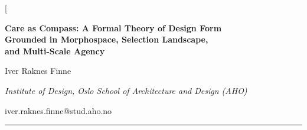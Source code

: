 



\twocolumn[{%
\begin{@twocolumnfalse}

\vspace*{2mm}

{\centering
{\Large\bfseries Care as Compass: A Formal Theory of Design Form\\[2pt]
Grounded in Morphospace, Selection Landscape,\\[2pt]
and Multi-Scale Agency\par}

\vspace{8pt}

{\normalsize Iver Raknes Finne\par}
\vspace{1pt}
{\small\itshape Institute of Design, Oslo School of Architecture and Design (AHO)\par}
\vspace{0pt}
{\small iver.raknes.finne@stud.aho.no\par}

\vspace{10pt}

\begin{minipage}{0.94\textwidth}
\noindent\rule{\textwidth}{0.4pt}
\vspace{4pt}


\end{minipage}}
\end{@twocolumnfalse}}
